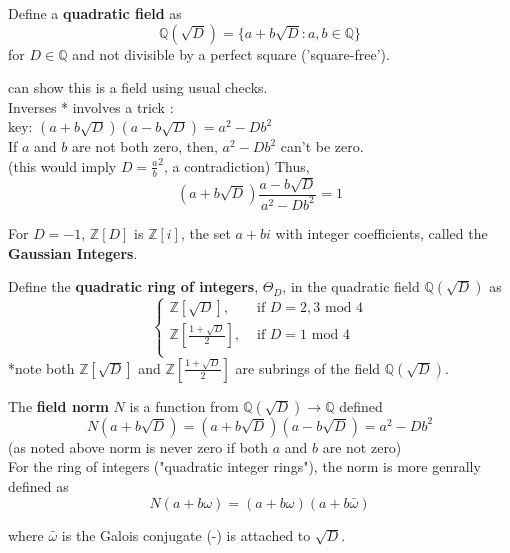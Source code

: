\documentclass[12pt]{article}
\begin{document}
Define a \textbf{quadratic field} as 
$$\mathbb{Q}(\sqrt D) = \{ a + b \sqrt D : a, b \in \mathbb{Q}\}$$
for $D \in \mathbb{Q}$ and not divisible by a perfect square ('square-free').

\textcolor[gray]{0.5}{can show this is a field using usual checks.\\
Inverses * involves a trick : \\
key: $(a + b \sqrt D)(a - b \sqrt D) = a^2 - Db^2$\\
If $a$ and $b$ are not both zero, then, $a^2 - Db^2$ can't be zero.\\
(this would imply $D = \frac{a}{b}^2$, a contradiction)
Thus, $$(a + b \sqrt D)\frac{a - b \sqrt D}{a^2 - Db^2} = 1$$
}

For $D = -1$, $\mathbb{Z}[D]$ is $\mathbb{Z}[i]$, the set $a + bi$ with integer coefficients, called the \textbf{Gaussian Integers}.\\
\medskip

\noindent Define the \textbf{quadratic ring of integers}, $\Theta_D$, in the quadratic field $\mathbb{Q}(\sqrt D)$ as\\
 \begin{displaymath}
      \left\{
     \begin{array}{lr}
     \mathbb{Z}[\sqrt D], & \text{ if } D = 2, 3 \text{ mod } 4\\
     \mathbb{Z}[\frac{1 + \sqrt D}{2}], & \text{ if } D = 1 \text{ mod } 4\\
     \end{array}
     \right.
 \end{displaymath} 
 *note both $\mathbb{Z}[\sqrt D]$ and $\mathbb{Z}[\frac{1 + \sqrt D}{2}]$ are subrings of the field $\mathbb{Q}(\sqrt D)$.\\
\medskip

The \textbf{field norm} $N$ is a function from $\mathbb{Q}(\sqrt D) \rightarrow \mathbb{Q}$ defined 
$$N(a + b \sqrt D) = (a + b \sqrt D)(a - b \sqrt D) = a^2 - D b^2$$
(as noted above norm is never zero if both $a$ and $b$ are not zero)\\

For the ring of integers ("quadratic integer rings"), the norm is more genrally defined as
$$N(a + b\omega) = (a + b\omega)(a + b \bar{\omega}) $$

where $\bar\omega$ is the Galois conjugate (-) is attached to $\sqrt D$.\\

\end{document}
